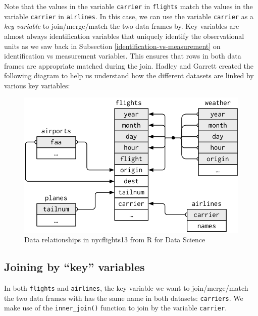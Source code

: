 \documentclass[12pt,]{krantz}
\begin{document}
Note that the values in the variable \texttt{carrier} in
\texttt{flights} match the values in the variable \texttt{carrier} in
\texttt{airlines}. In this case, we can use the variable
\texttt{carrier} as a \emph{key variable} to join/merge/match the two
data frames by. Key variables are almost always identification variables
that uniquely identify the observational units as we saw back in
Subsection \ref{identification-vs-measurement} on identification vs
measurement variables. This ensures that rows in both data frames are
appropriate matched during the join. Hadley and Garrett \citep{rds2016}
created the following diagram to help us understand how the different
datasets are linked by various key variables:

\begin{figure}

{\centering \includegraphics[width=\textwidth]{images/relational-nycflights} 

}

\caption{Data relationships in nycflights13 from R for Data Science}\label{fig:reldiagram}
\end{figure}

\subsection{\texorpdfstring{Joining by ``key''
variables}{Joining by key variables}}\label{joining-by-key-variables}

In both \texttt{flights} and \texttt{airlines}, the key variable we want
to join/merge/match the two data frames with has the same name in both
datasets: \texttt{carriers}. We make use of the \texttt{inner\_join()}
function to join by the variable \texttt{carrier}.
\end{document}
